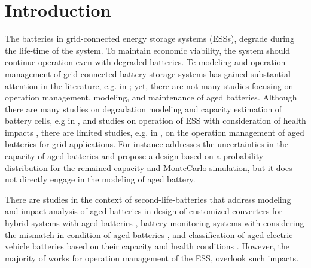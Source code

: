 \documentclass[10pt,twocolumn]{IEEEtran}
\begin{document}


\section{Introduction}

%
%
%
The batteries in grid-connected energy storage systems (ESSs), degrade  during the life-time of the system.
To maintain economic viability, the system should continue operation even with  degraded batteries.
Te modeling and operation management of grid-connected battery storage systems has gained substantial attention in the literature, e.g. in \cite{8663451, 8003332}; yet, there are not  many studies focusing on operation management, modeling, and maintenance of aged batteries.  
Although there are many studies on degradation modeling and capacity estimation of battery cells, e.g in \cite{rong2006analytical,  roscher2011detection, martinez2016evaluation, goebel2008prognostics},  and  studies on operation of ESS with consideration of health impacts \cite{MASIHTEHRANI20132, 7588052, 7428105}, there are limited studies, e.g. in \cite{saez2015second, keeli2012optimal},  on the operation management of aged batteries for grid applications. For instance \cite{keeli2012optimal} addresses  the uncertainties in the capacity of aged batteries and propose a design based on a probability distribution for the remained capacity and  MonteCarlo simulation,  but  it does not directly engage in the modeling of aged battery.

There are studies in the context of second-life-batteries that address modeling and impact analysis of aged batteries in design of customized converters for hybrid systems with aged batteries \cite{6861989}, battery monitoring systems with considering the mismatch in condition of aged  batteries \cite{tong2017demonstration}, and classification of aged electric vehicle batteries based on their capacity and health conditions \cite{liao2017performance}. However, the majority of works for operation management of the ESS, overlook such impacts.
\end{document}
